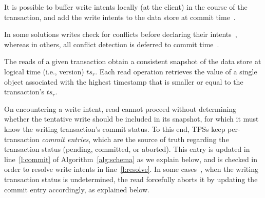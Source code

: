 It is possible to buffer write intents locally (at the client) in the course of the transaction, and add the write intents to the data store at commit time~\cite{Percolator2010}.

In some solutions writes check for conflicts before declaring their intents~\cite{cockroach}, whereas in others, 
all conflict detection is deferred to commit time~\cite{Percolator2010,OmidICDE2014,Omid2017,tephra}. 

The reads of a given transaction obtain a consistent snapshot of the data store at logical time (i.e., version) $ts_r$.
Each read operation retrieves the value of a single object associated with the highest timestamp that is 
smaller or equal to the transaction's $ts_r$. 

On encountering a write intent, read cannot proceed without determining whether the tentative write should be included in its snapshot,
for which it must know the writing transaction's commit status. 
To this end, TPSs keep per-transaction \emph{commit entries}, which are the source of truth regarding the transaction status 
(pending, committed, or aborted). 
This entry is updated in line~\ref{l:commit} of Algorithm~\ref{alg:schema} as we explain below, 
and is checked in order to resolve write intents in line~\ref{l:resolve}.
In some cases~\cite{Percolator2010,cockroach}, when the writing transaction status is undetermined, the read forcefully aborts
it by updating the commit entry accordingly, as explained below.


